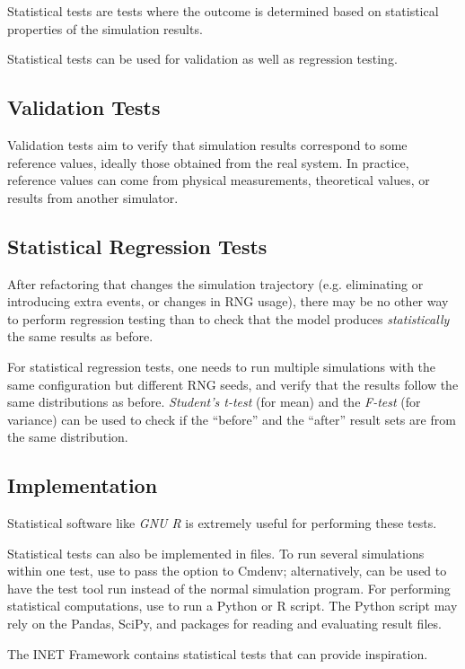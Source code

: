 Statistical tests are tests where the outcome is determined based on statistical
properties of the simulation results.

Statistical tests can be used for validation as well as regression testing.

\subsection{Validation Tests}
\label{sec:testing:validation-tests}

Validation tests aim to verify that simulation results correspond to some
reference values, ideally those obtained from the real system. In practice,
reference values can come from physical measurements, theoretical values, or
results from another simulator.

\subsection{Statistical Regression Tests}
\label{sec:testing:statistical-regression-tests}

After refactoring that changes the simulation trajectory (e.g. eliminating or
introducing extra events, or changes in RNG usage), there may be no other way to
perform regression testing than to check that the model produces
\textit{statistically} the same results as before.

For statistical regression tests, one needs to run multiple simulations with the
same configuration but different RNG seeds, and verify that the results follow
the same distributions as before. \textit{Student's t-test} (for mean) and the
\textit{F-test} (for variance) can be used to check if the ``before'' and the ``after''
result sets are from the same distribution.

\subsection{Implementation}
\label{sec:testing:statistical-tests-implementation}

Statistical software like \textit{GNU R} is extremely useful for performing
these tests.

Statistical tests can also be implemented in  files. To run several
simulations within one test, use  to pass the  option to Cmdenv; alternatively,  can be used to have
the test tool run  instead of the normal simulation program.
For performing statistical computations, use  to run a
Python or R script. The Python script may rely on the Pandas, SciPy, and 
packages for reading and evaluating {\opp} result files.

The INET Framework contains statistical tests that can provide inspiration.



